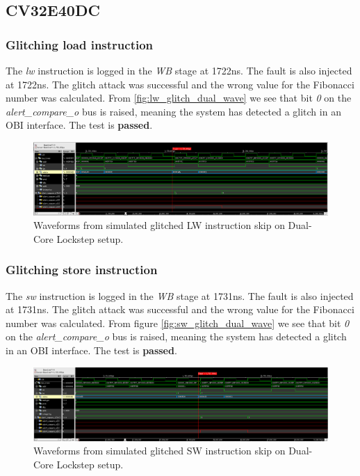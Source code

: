 \subsection{CV32E40DC}

\subsubsection{Glitching load instruction}

The \textit{lw} instruction is logged in the \textit{WB} stage at 1722ns. The fault is also injected at 1722ns. The glitch attack was successful and the wrong value for the Fibonacci number was calculated. From \autoref{fig:lw_glitch_dual_wave} we see that bit \textit{0} on the \textit{alert\_compare\_o} bus is raised, meaning the system has detected a glitch in an OBI interface. The test is \textbf{passed}.

\begin{figure}[h!]
    \centering
    \includegraphics[width=\textwidth]{docs/images/lw_glitch_dual_core.png}
    \caption{Waveforms from simulated glitched LW instruction skip on Dual-Core Lockstep setup.}
    \label{fig:lw_glitch_dual_wave}
\end{figure}

\subsubsection{Glitching store instruction}

The \textit{sw} instruction is logged in the \textit{WB} stage at 1731ns. The fault is also injected at 1731ns. The glitch attack was successful and the wrong value for the Fibonacci number was calculated. From figure \autoref{fig:sw_glitch_dual_wave} we see that bit \textit{0} on the \textit{alert\_compare\_o} bus is raised, meaning the system has detected a glitch in an OBI interface. The test is \textbf{passed}.

\begin{figure}[h!]
    \centering
    \includegraphics[width=\textwidth]{docs/images/sw_glitch_dual_core.png}
    \caption{Waveforms from simulated glitched SW instruction skip on Dual-Core Lockstep setup.}
    \label{fig:sw_glitch_dual_wave}
\end{figure}


